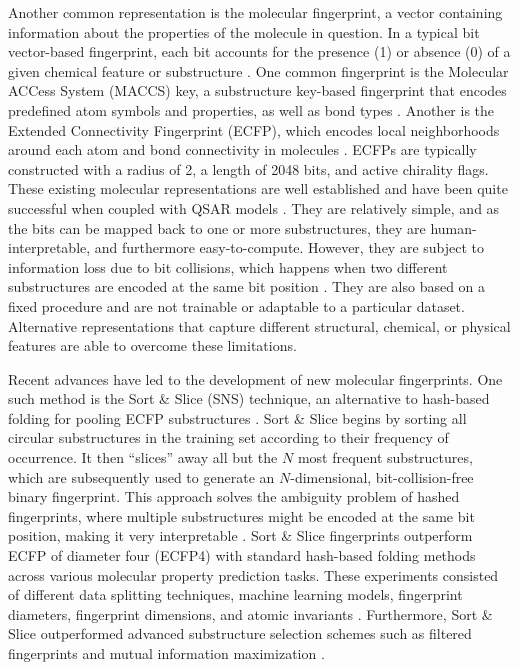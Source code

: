 Another common representation is the molecular fingerprint, a vector containing information about the properties of the molecule in question. In a typical bit vector-based fingerprint, each bit accounts for the presence (1) or absence (0) of a given chemical feature or substructure \citep{Fassio2022}. One common fingerprint is the Molecular ACCess System (MACCS) key, a substructure key-based fingerprint that encodes predefined atom symbols and properties, as well as bond types \citep{Xie2020}. Another is the Extended Connectivity Fingerprint (ECFP), which encodes local neighborhoods around each atom and bond connectivity in molecules \citep{Xie2020}. ECFPs are typically constructed with a radius of 2, a length of 2048 bits, and active chirality flags. These existing molecular representations are well established and have been quite successful when coupled with QSAR models \citep{CortsCiriano2020, Sabando2021}. They are relatively simple, and as the bits can be mapped back to one or more substructures, they are human-interpretable, and furthermore easy-to-compute. However, they are subject to information loss due to bit collisions, which happens when two different substructures are encoded at the same bit position \citep{Fassio2022}. They are also based on a fixed procedure and are not trainable or adaptable to a particular dataset. Alternative representations that capture different structural, chemical, or physical features are able to overcome these limitations. 

Recent advances have led to the development of new molecular fingerprints. One such method is the Sort \& Slice (SNS) technique, an alternative to hash-based folding for pooling ECFP substructures \citep{sns}. Sort \& Slice begins by sorting all circular substructures in the training set according to their frequency of occurrence. It then ``slices'' away all but the $N$ most frequent substructures, which are subsequently used to generate an $N$-dimensional, bit-collision-free binary fingerprint. This approach solves the ambiguity problem of hashed fingerprints, where multiple substructures might be encoded at the same bit position, making it very interpretable \citep{sns}. Sort \& Slice fingerprints outperform ECFP of diameter four (ECFP4) with standard hash-based folding methods across various molecular property prediction tasks. These experiments consisted of different data splitting techniques, machine learning models, fingerprint diameters, fingerprint dimensions, and atomic invariants \citep{sns}. Furthermore, Sort \& Slice outperformed advanced substructure selection schemes such as filtered fingerprints and mutual information maximization \citep{sns}. 


